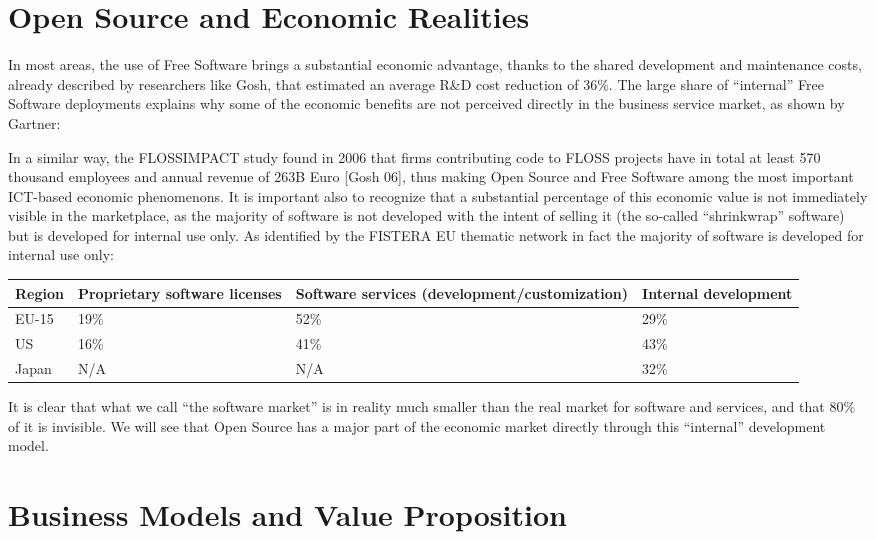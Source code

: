 \section*{Open Source and Economic Realities}

In most areas, the use of Free Software brings a substantial economic advantage,
thanks to the shared development and maintenance costs, already described by
researchers like Gosh, that estimated an average R\&D cost reduction of 36\%.
The large share of ``internal'' Free Software deployments explains why some of the
economic benefits are not perceived directly in the business service market, as
shown by Gartner:

In a similar way, the FLOSSIMPACT study found in 2006 that firms contributing
code to FLOSS projects have in total at least 570 thousand employees and annual
revenue of 263B Euro [Gosh 06], thus making Open Source and Free Software among the
most important ICT-based economic phenomenons. It is important also to recognize
that a substantial percentage of this economic value is not immediately visible
in the marketplace, as the majority of software is not developed with the intent
of selling it (the so-called ``shrinkwrap'' software) but is developed for
internal use only. As identified by the FISTERA EU thematic network in fact the
majority of software is developed for internal use only:

\begin{tabularx}{\textwidth}{|X|X|X|X|}
\hline
Region & Proprietary software licenses & Software services
(de\-vel\-op\-ment/\-cus\-tom\-i\-za\-ti\-on) & Internal development\\
\hline
EU-15 & 19\% & 52\% & 29\% \\
\hline
US & 16\% & 41\% & 43\% \\
\hline
Japan & N/A & N/A & 32\% \\
\hline
\end{tabularx}

It is clear that what we call ``the software market'' is in reality much smaller
than the real market for software and services, and that 80\% of it is
invisible. We will see that Open Source has a major part of the economic market
directly through this ``internal'' development model.

\section*{Business Models and Value Proposition}

